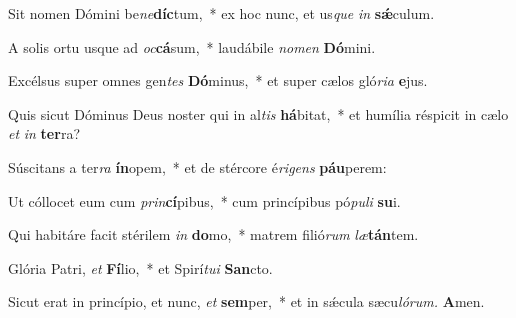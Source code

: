 \item Sit nomen Dómini be\hspace*{0.01em}\textit{ne}\textbf{díc}tum,~* ex hoc nunc, et us\hspace*{0.03em}\textit{que} \textit{in} \textbf{sǽ}culum.
\item A solis ortu usque ad \textit{oc}\textbf{cá}sum,~* laudábile \textit{nomen} \textbf{Dó}mini.
\item Excélsus super omnes gen\hspace*{0.01em}\textit{tes} \textbf{Dó}minus,~* et super cælos gló\textit{ria} \textbf{e}jus.
\item Quis sicut Dóminus Deus noster qui in al\textit{tis} \textbf{há}bitat,~* et humília réspicit in cælo \textit{et} \textit{in} \textbf{ter}ra?
\item Súscitans a ter\textit{ra} \textbf{ín}opem,~* et de stércore é\textit{rigens} \textbf{páu}perem:
\item Ut cóllocet eum cum \textit{prin}\textbf{cí}pibus,~* cum princípibus pó\textit{puli} \textbf{su}i.
\item Qui habitáre facit stérilem \textit{in} \textbf{do}mo,~* matrem filió\textit{rum} \textit{læ}\textbf{tán}tem.
\item Glória Patri, \textit{et} \textbf{Fí}lio,~* et Spirí\hspace{0.03em}\textit{tui} \textbf{San}cto.
\item Sicut erat in princípio, et nunc, \textit{et} \textbf{sem}per,~* et in sǽcula sæcu\hspace*{0.03em}\textit{lórum.} \textbf{A}men.